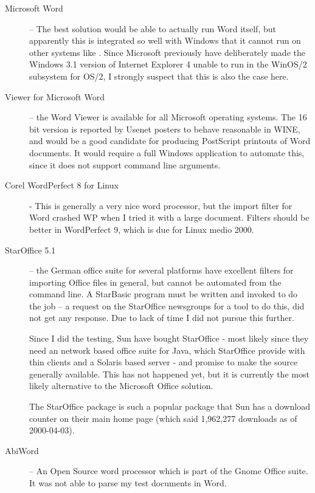 \begin{description}
\item[Microsoft Word] -- The best solution would be able to
  actually run Word itself, but apparently this is
  integrated so well with Windows that it cannot run on
  other systems like .
  Since Microsoft previously have deliberately made the
  Windows 3.1 version of Internet Explorer 4 unable to run
  in the WinOS/2 subsystem for OS/2, I strongly suspect that
  this is also the case here.
  
\item[Viewer for Microsoft Word] -- the Word Viewer is
  available for all Microsoft operating systems.  The 16 bit
  version is reported by Usenet posters to behave reasonable
  in WINE, and would be a good candidate for producing
  PostScript printouts of Word documents.  It would require
  a full Windows application to automate this, since it does
  not support command line arguments.
  
\item[Corel WordPerfect 8 for Linux] - This is generally a
  very nice word processor, but the import filter for Word
  crashed WP when I tried it with a large document.  Filters
  should be better in WordPerfect 9, which is due for Linux
  medio 2000.
  
\item[StarOffice 5.1] -- the German office suite for several
  platforms have excellent filters for importing Office
  files in general, but cannot be automated from the command
  line.  A StarBasic program must be written and invoked to
  do the job -- a request on the StarOffice newsgroups for a
  tool to do this, did not get any response.  Due to lack of
  time I did not pursue this further.
  
  Since I did the testing, Sun have bought StarOffice - most
  likely since they need an network based office suite for
  Java, which StarOffice provide with thin clients and a
  Solaris based server - and promise to make the source
  generally available.  This has not happened yet, but it is
  currently the most likely alternative to the Microsoft
  Office solution.
  
  The StarOffice package is such a popular package that Sun
  has a download counter on their main home page (which said
  1,962,277 downloads as of 2000-04-03).
  
  
\item[AbiWord] -- An Open Source word processor which is
  part of the Gnome Office suite.  It was not able to parse
  my test documents in Word.
  

\end{description}
